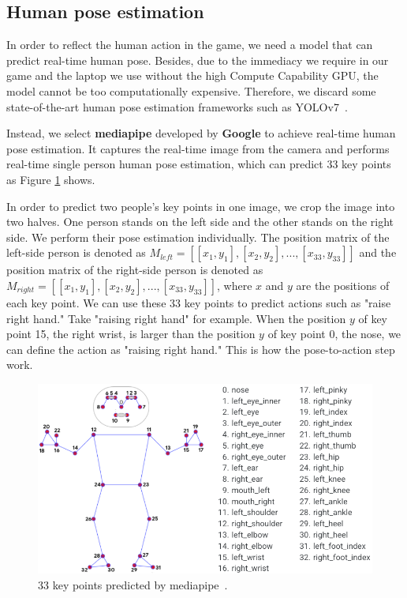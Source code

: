 \subsection{Human pose estimation}
% 

In order to reflect the human action in the game, we need a model that can predict real-time human pose. Besides, due to the immediacy we require in our game and the laptop we use without the high Compute Capability GPU, the model cannot be too computationally expensive. Therefore, we discard some state-of-the-art human pose estimation frameworks such as YOLOv7~\cite{Alpher06}. 

\label{mediapipework}
Instead, we select \textbf{mediapipe}\cite{lugaresi2019mediapipe} developed by \textbf{Google} to achieve real-time human pose estimation. It captures the real-time image from the camera and performs real-time single person human pose estimation, which can predict 33 key points as Figure \ref{fig:medpose} shows.

In order to predict two people's key points in one image, we crop the image into two halves. One person stands on the left side and the other stands on the right side. We perform their pose estimation individually. The position matrix of the left-side person is denoted as $M_{left}=[[x_1, y_1],[x_2, y_2],...,[x_{33}, y_{33}]]$ and the position matrix of the right-side person is denoted as $M_{right}=[[x_1, y_1],[x_2, y_2],...,[x_{33}, y_{33}]]$, where $x$ and $y$ are the positions of each key point. We can use these 33 key points to predict actions such as "raise right hand." Take "raising right hand" for example. When the position $y$ of key point 15, the right wrist, is larger than the position $y$ of key point 0, the nose, we can define the action as "raising right hand." This is how the pose-to-action step work.


\begin{figure}[ht]
    \centering
    \includegraphics[scale=.3]{fig/medpose.png}
    \caption{33 key points predicted by mediapipe~\cite{lugaresi2019mediapipe}.}
    \label{fig:medpose}
\end{figure}


